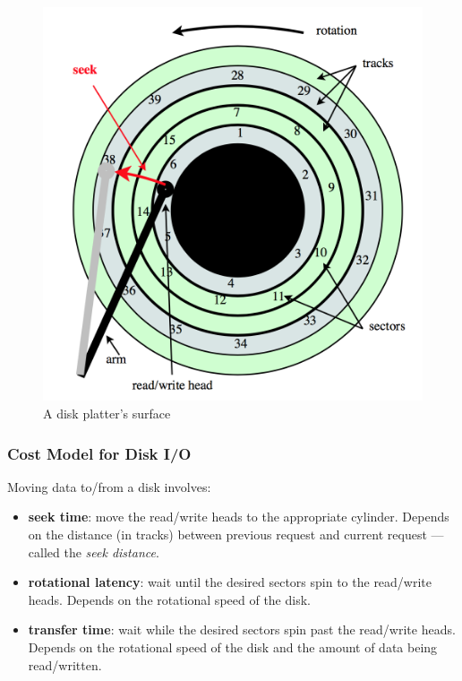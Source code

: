 \documentclass[12pt]{article}
\theoremstyle{plain}
\theoremstyle{definition}
\begin{document}
\begin{figure}[H]
  \centering
  \includegraphics[scale=0.4]{pictures/disk_platter.png}
  \caption{A disk platter's surface}
  \label{fig:disk_platter}
\end{figure}

\subsubsection{Cost Model for Disk I/O}
Moving data to/from a disk involves:
\begin{itemize}
  \item \textbf{seek time}: move the read/write heads to the appropriate cylinder.
  Depends on the distance (in tracks) between previous request and current request --- called the \emph{seek distance}.

  \item \textbf{rotational latency}: wait until the desired sectors spin to the read/write heads.
  Depends on the rotational speed of the disk.

  \item \textbf{transfer time}: wait while the desired sectors spin past the read/write heads.
  Depends on the rotational speed of the disk and the amount of data being read/written.
\end{itemize}
\end{document}
